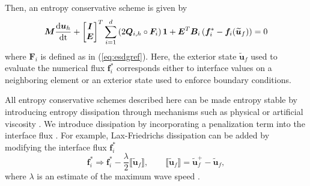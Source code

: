 \documentclass{svjour3}                     %
\renewcommand{\hat}{\widehat}
\renewcommand{\tilde}{\widetilde}
\newcommand{\td}[2]{\frac{{\rm d}#1}{{\rm d}{\rm #2}}}
\newcommand{\LRp}[1]{\left( #1 \right)}
\newcommand{\jump}[1] {\ensuremath{\llbracket#1\rrbracket}}
\begin{document}

Then, an entropy conservative scheme is given by
\begin{gather}
{\bm{M}}\td{\bm{u}_h}{t} + \begin{bmatrix} \bm{I} \\ \bm{E} \end{bmatrix}^T
\sum_{i=1}^d \LRp{2{\bm{Q}}_{i,h} \circ \bm{F}_i}\bm{1} + \bm{E}^T{\bm{B}}_i\LRp{\bm{f}_i^*-\bm{f}_i(\tilde{\bm{u}}_f)} = 0 \label{eq:esdg}
\end{gather}
where $\bm{F}_i$ is defined as in (\ref{eq:esdgref}).  Here, the exterior state $\tilde{\bm{u}}_f$ used to evaluate the numerical flux $\bm{f}_i^*$ corresponds either to interface values on a neighboring element or an exterior state used to enforce boundary conditions.

All entropy conservative schemes described here can be made entropy stable by introducing entropy dissipation through mechanisms such as physical or artificial viscosity \cite{tadmor2006entropy,upperman2019entropy}.  We introduce dissipation by incorporating a penalization term into the interface flux \cite{winters2017uniquely}.  For example, Lax-Friedrichs dissipation can be added by modifying the interface flux $\bm{f}^*_i$ 
\[
\bm{f}^*_i \Longrightarrow \bm{f}^*_i - \frac{\lambda}{2} \jump{\tilde{\bm{u}}_f}, \qquad  \jump{\tilde{\bm{u}}_f} = \tilde{\bm{u}}_f^+ - \tilde{\bm{u}}_f,
\]
where $\lambda$ is an estimate of the maximum wave speed \cite{chen2017entropy, chan2017discretely}.  
\end{document}
